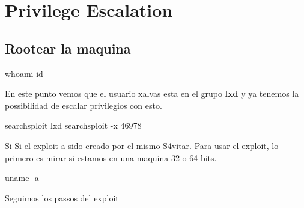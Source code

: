 \documentclass{assets/ipesethesis}
\newenvironment{Shaded}{\begin{snugshade}}{\end{snugshade}}
\newcommand{\ExtensionTok}[1]{#1}
\newcommand{\FunctionTok}[1]{\textcolor[rgb]{0.00,0.00,0.00}{#1}}
\newcommand{\NormalTok}[1]{#1}
\begin{document}
\hypertarget{privilege-escalation-5}{%
\section*{Privilege Escalation}\label{privilege-escalation-5}}

\hypertarget{rootear-la-maquina-1}{%
\subsection*{Rootear la maquina}\label{rootear-la-maquina-1}}

\begin{Shaded}
\begin{Highlighting}[]
\FunctionTok{whoami}
\FunctionTok{id}
\end{Highlighting}
\end{Shaded}

En este punto vemos que el usuario xalvas esta en el grupo \textbf{lxd} y ya tenemos la possibilidad de escalar privilegios con esto.

\begin{Shaded}
\begin{Highlighting}[]
\ExtensionTok{searchsploit}\NormalTok{ lxd}
\ExtensionTok{searchsploit}\NormalTok{ -x 46978}
\end{Highlighting}
\end{Shaded}

Si Si el exploit a sido creado por el mismo S4vitar. Para usar el exploit, lo primero es mirar si estamos en una maquina 32 o 64 bits.

\begin{Shaded}
\begin{Highlighting}[]
\FunctionTok{uname}\NormalTok{ -a}
\end{Highlighting}
\end{Shaded}

Seguimos los passos del exploit
\end{document}
